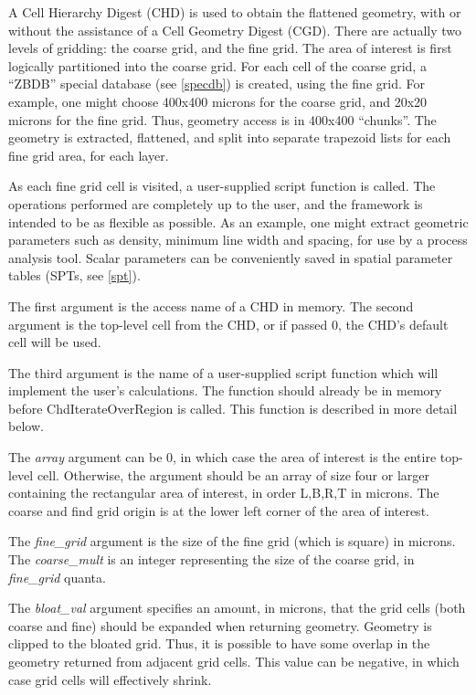 \begin{description}
A Cell Hierarchy Digest (CHD) is used to obtain the flattened
geometry, with or without the assistance of a Cell Geometry Digest
(CGD).  There are actually two levels of gridding:  the coarse grid,
and the fine grid.  The area of interest is first logically
partitioned into the coarse grid.  For each cell of the coarse grid, a
``ZBDB'' special database (see \ref{specdb}) is created, using the
fine grid.  For example, one might choose 400x400 microns for the
coarse grid, and 20x20 microns for the fine grid.  Thus, geometry
access is in 400x400 ``chunks''.  The geometry is extracted,
flattened, and split into separate trapezoid lists for each fine grid
area, for each layer.

As each fine grid cell is visited, a user-supplied script function is
called.  The operations performed are completely up to the user, and
the framework is intended to be as flexible as possible.  As an
example, one might extract geometric parameters such as density,
minimum line width and spacing, for use by a process analysis tool. 
Scalar parameters can be conveniently saved in spatial parameter
tables (SPTs, see \ref{spt}).

The first argument is the access name of a CHD in memory.  The second
argument is the top-level cell from the CHD, or if passed 0, the CHD's
default cell will be used.

The third argument is the name of a user-supplied script function
which will implement the user's calculations.  The function should
already be in memory before {\vt ChdIterateOverRegion} is called. 
This function is described in more detail below.

The {\it array} argument can be 0, in which case the area of interest
is the entire top-level cell.  Otherwise, the argument should be an
array of size four or larger containing the rectangular area of
interest, in order L,B,R,T in microns.  The coarse and find grid
origin is at the lower left corner of the area of interest.

The {\it fine\_grid} argument is the size of the fine grid (which is
square) in microns.  The {\it coarse\_mult} is an integer representing
the size of the coarse grid, in {\it fine\_grid} quanta.

The {\it bloat\_val} argument specifies an amount, in microns, that
the grid cells (both coarse and fine) should be expanded when
returning geometry.  Geometry is clipped to the bloated grid.  Thus,
it is possible to have some overlap in the geometry returned from
adjacent grid cells.  This value can be negative, in which case grid
cells will effectively shrink.


\end{description}
